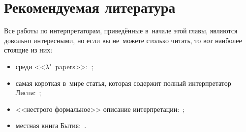 \section*{Рекомендуемая литература}

Все работы по интерпретаторам, приведённые в~начале этой главы, являются
довольно интересными, но если вы не~можете столько читать, то вот наиболее
стоящие из них:
\begin{itemize}
  \item среди <<$\lambda$"~papers>>:~\cite{ss78a};
  
  \item самая короткая в~мире статья, которая содержит полный интерпретатор
        Лиспа:~\cite{mcc78b};
  
  \item <<нестрого формальное>> описание интерпретации:~\cite{rey72};
  
  \item местная книга Бытия:~\cite{mae+62}.
\end{itemize}
